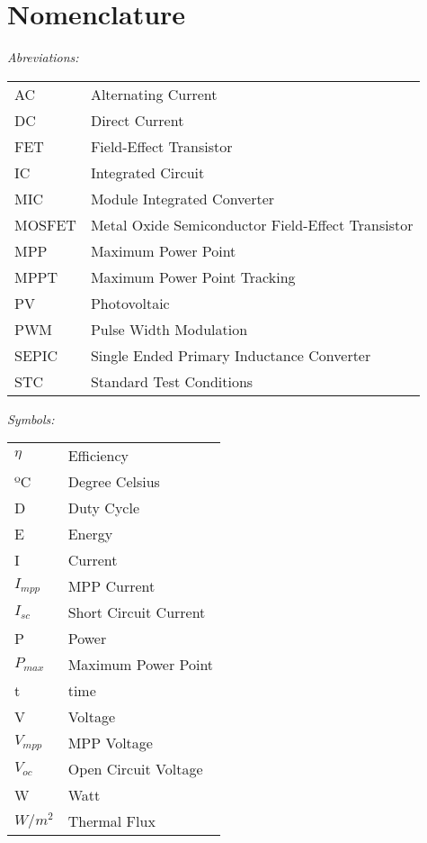 \chapter*{Nomenclature}

\textit{Abreviations:}\newline
\begin{tabular}{ll} %
AC & Alternating Current\\
DC & Direct Current\\
FET & Field-Effect Transistor\\
IC & Integrated Circuit\\
MIC & Module Integrated Converter\\
MOSFET & Metal Oxide Semiconductor Field-Effect Transistor\\
MPP & Maximum Power Point\\
MPPT & Maximum Power Point Tracking\\
PV & Photovoltaic\\
PWM & Pulse Width Modulation\\
SEPIC & Single Ended Primary Inductance Converter\\
STC & Standard Test Conditions\\
\end{tabular}

\vspace{10mm} %

\textit{Symbols:}\newline
\begin{tabular}{ll}
$\eta$ & Efficiency\\
ºC & Degree Celsius\\
D & Duty Cycle\\
E & Energy\\
I & Current\\
$I_{mpp}$ & MPP Current\\
$I_{sc}$ & Short Circuit Current\\
P & Power\\
$P_{max}$ & Maximum Power Point\\
t & time\\
V & Voltage\\
$V_{mpp}$ & MPP Voltage\\
$V_{oc}$ & Open Circuit Voltage\\
W & Watt\\
$W/m^2$ & Thermal Flux\\
\end{tabular}